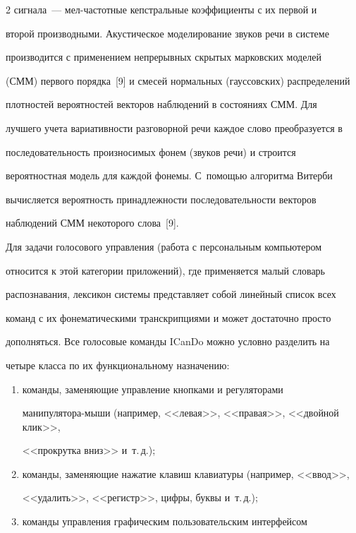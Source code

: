\begin{multicols}{2}
сигнала~--- мел-час\-тот\-ные кепстральные коэффициенты с их первой и 


второй производными. Акустическое моделирование звуков речи в системе 


производится с применением непрерывных скрытых марковских моделей 


(СММ) первого порядка~[9] и смесей нормальных (гауссовских) распределений 


плотностей вероятностей векторов наблюдений в состояниях СММ. Для 


лучшего учета вариативности разговорной речи каждое слово преобразуется в 


последовательность произносимых фонем (звуков речи) и строится 


вероятностная модель для каждой фонемы. С~помощью алгоритма Витерби 


вычисляется вероятность принадлежности последовательности векторов 


наблюдений СММ некоторого слова~[9]. 


  


  Для задачи голосового управления (работа с персональным компьютером 


относится к этой категории приложений), где применяется малый словарь 


распознавания, лексикон системы представляет собой линейный список всех 


команд с их фонематическими транскрипциями и может достаточно прос\-то 


дополняться. Все голосовые команды \mbox{ICanDo} можно условно разделить на 


четыре класса по их функциональному назначению: 


  \begin{enumerate}[(1)]


\item команды, заменяющие управление кнопками и регуляторами 


манипулятора-мыши (например, <<левая>>, <<правая>>, <<двойной клик>>, 


<<прокрутка вниз>> и~т.\,д.); 


\item команды, заменяющие нажатие клавиш клавиатуры (например, <<ввод>>, 


<<удалить>>, <<регистр>>, цифры, буквы и~т.\,д.); 


\item команды управления графическим пользовательским интерфейсом 



\end{enumerate}
\end{multicols}
